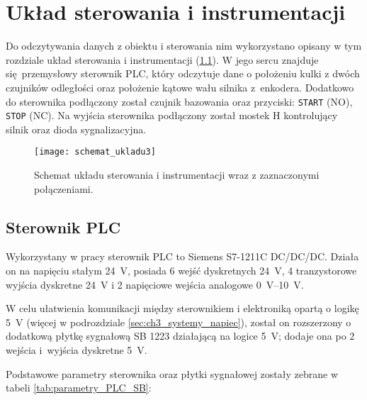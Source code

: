 \chapter{Układ sterowania i instrumentacji}
\label{cha:ch3_uklad_ster_i_instrumentacji}

Do odczytywania danych z obiektu i sterowania nim wykorzystano opisany w tym rozdziale układ sterowania i instrumentacji (\cref{fig:schemat_ukl_sterowania_instrumentacji}). W jego sercu znajduje się przemysłowy sterownik PLC, który odczytuje dane o położeniu kulki z dwóch czujników odległości oraz położenie kątowe wału silnika z~enkodera. Dodatkowo do sterownika podłączony został czujnik bazowania oraz przyciski: \texttt{START} (NO), \texttt{STOP} (NC). Na wyjścia sterownika podłączony został mostek H kontrolujący silnik oraz dioda sygnalizacyjna.


\begin{figure}[H]
    \centering
    \texttt{[image: schemat\_ukladu3]}
    \caption{Schemat układu sterowania i instrumentacji wraz z zaznaczonymi połączeniami.}
    \label{fig:schemat_ukl_sterowania_instrumentacji}
\end{figure}

\section{Sterownik PLC}
\label{sec:ch3_PLC}

Wykorzystany w pracy sterownik PLC to Siemens S7-1211C DC/DC/DC. Działa on na napięciu stałym \SI{24}{V}, posiada 6 wejść dyskretnych \SI{24}{V}, 4 tranzystorowe wyjścia dyskretne \SI{24}{V} i 2 napięciowe wejścia analogowe \SIrange{0}{10}{V}.

W celu ułatwienia komunikacji między sterownikiem i elektroniką opartą o logikę \SI{5}{V} (więcej w podrozdziale \ref{sec:ch3_systemy_napiec}), został on rozszerzony o dodatkową płytkę sygnałową SB 1223 działającą na logice \SI{5}{V}; dodaje ona po 2 wejścia i~wyjścia dyskretne \SI{5}{V}.

Podstawowe parametry sterownika oraz płytki sygnałowej zostały zebrane w tabeli \ref{tab:parametry_PLC_SB}:

